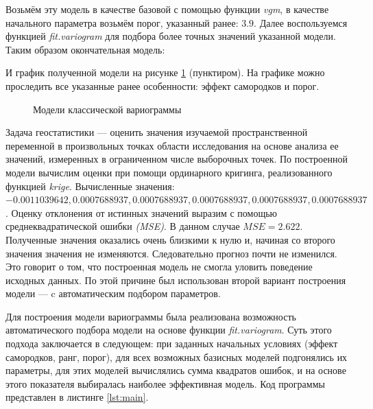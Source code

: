 Возьмём эту модель в качестве базовой с помощью функции \textit{vgm}, в качестве начального параметра возьмём порог, указанный ранее: $3.9$. Далее воспользуемся функцией \textit{fit.variogram} для подбора более точных значений указанной модели. Таким образом окончательная модель:

И график полученной модели на рисунке \ref{img:var-models} (пунктиром). На графике можно проследить все указанные ранее особенности: эффект самородков и порог.
\begin{figure}[ht]
\caption{Модели классической вариограммы}
\label{img:var-models}
\end{figure}

Задача геостатистики --- оценить значения изучаемой пространственной переменной в произвольных точках области исследования на основе анализа ее значений, измеренных в ограниченном числе выборочных точек. По построенной модели вычислим оценки при помощи ординарного кригинга, реализованного функцией \textit{krige}. Вычисленные значения: $-0.0011039642,  0.0007688937,  0.0007688937,  0.0007688937,  0.0007688937,  0.0007688937$. Оценку отклонения от истинных значений выразим с помощью среднеквадратической ошибки \textit{(MSE)}. В данном случае $ MSE = 2.622 $. Полученные значения оказались очень близкими к нулю и, начиная со второго значения значения не изменяются. Следовательно прогноз почти не изменился. Это говорит о том, что построенная модель не смогла уловить поведение исходных данных. По этой причине был использован второй вариант построения модели --- c автоматическим подбором параметров.

Для построения модели вариограммы была реализована возможность автоматического подбора модели на основе функции \textit{fit.variogram}. Суть этого подхода заключается в следующем: при заданных начальных условиях (эффект самородков, ранг, порог), для всех возможных базисных моделей подгонялись их параметры, для этих моделей вычислялись сумма квадратов ошибок, и на основе этого показателя выбиралась наиболее эффективная модель. Код программы представлен в листинге \ref{lst:main}.

